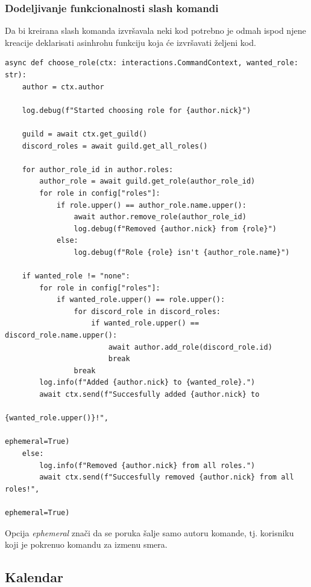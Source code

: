 \documentclass[a4paper,11pt]{article}
\begin{document}
\subsubsection{Dodeljivanje funkcionalnosti slash komandi}
Da bi kreirana slash komanda izvršavala neki kod potrebno je odmah ispod njene kreacije deklarisati asinhrohu funkciju koja će izvršavati željeni kod.
\begin{verbatim}
async def choose_role(ctx: interactions.CommandContext, wanted_role: str):
    author = ctx.author

    log.debug(f"Started choosing role for {author.nick}")

    guild = await ctx.get_guild()
    discord_roles = await guild.get_all_roles()

    for author_role_id in author.roles:
        author_role = await guild.get_role(author_role_id)
        for role in config["roles"]:
            if role.upper() == author_role.name.upper():
                await author.remove_role(author_role_id)
                log.debug(f"Removed {author.nick} from {role}")
            else:
                log.debug(f"Role {role} isn't {author_role.name}")
    
    if wanted_role != "none":
        for role in config["roles"]:
            if wanted_role.upper() == role.upper():
                for discord_role in discord_roles:
                    if wanted_role.upper() == discord_role.name.upper():
                        await author.add_role(discord_role.id)
                        break
                break
        log.info(f"Added {author.nick} to {wanted_role}.")
        await ctx.send(f"Succesfully added {author.nick} to 
                                                    {wanted_role.upper()}!",
                                                             ephemeral=True)
    else:
        log.info(f"Removed {author.nick} from all roles.")
        await ctx.send(f"Succesfully removed {author.nick} from all roles!",
                                                             ephemeral=True)
\end{verbatim}
Opcija \textit{ephemeral} znači da se poruka šalje samo autoru komande, tj. korisniku koji je pokrenuo komandu za izmenu smera.
\newpage
\subsection{Kalendar}
\end{document}
